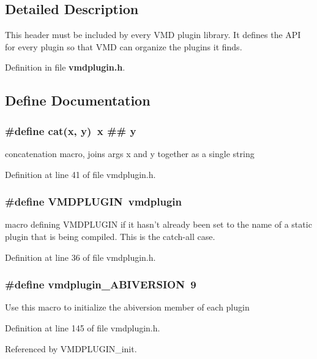 \subsection{Detailed Description}
 This header must be included by every VMD plugin library. It defines the API for every plugin so that VMD can organize the plugins it finds.



Definition in file {\bf vmdplugin.h}.

\subsection{Define Documentation}
\subsubsection{\setlength{\rightskip}{0pt plus 5cm}\#define cat(x, y)\ x \#\# y}\label{vmdplugin_8h_a2}


concatenation macro, joins args x and y together as a single string 

Definition at line 41 of file vmdplugin.h.
\subsubsection{\setlength{\rightskip}{0pt plus 5cm}\#define VMDPLUGIN\ vmdplugin}\label{vmdplugin_8h_a0}


macro defining VMDPLUGIN if it hasn't already been set to the name of  a static plugin that is being compiled. This is the catch-all case. 

Definition at line 36 of file vmdplugin.h.
\subsubsection{\setlength{\rightskip}{0pt plus 5cm}\#define vmdplugin\_\-ABIVERSION\ 9}\label{vmdplugin_8h_a10}


Use this macro to initialize the abiversion member of each plugin 

Definition at line 145 of file vmdplugin.h.

Referenced by VMDPLUGIN\_\-init.

